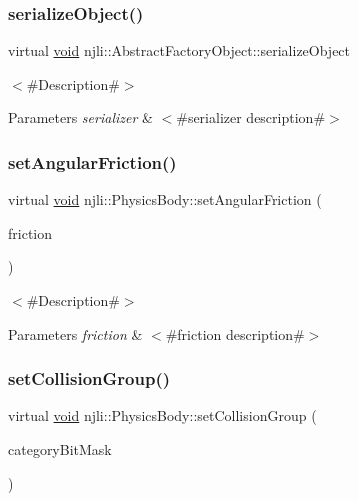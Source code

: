 \subsubsection{\texorpdfstring{serialize\+Object()}{serializeObject()}}
{\footnotesize\ttfamily virtual \mbox{\hyperlink{_thread_8h_af1e856da2e658414cb2456cb6f7ebc66}{void}} njli\+::\+Abstract\+Factory\+Object\+::serialize\+Object}

$<$\#\+Description\#$>$


\begin{DoxyParams}{Parameters}
{\em serializer} & $<$\#serializer description\#$>$ \\
\hline
\end{DoxyParams}
\mbox{\label{classnjli_1_1_physics_body_a9361f24aea1decf35d872e7509d4e9dc}} 
\subsubsection{\texorpdfstring{set\+Angular\+Friction()}{setAngularFriction()}}
{\footnotesize\ttfamily virtual \mbox{\hyperlink{_thread_8h_af1e856da2e658414cb2456cb6f7ebc66}{void}} njli\+::\+Physics\+Body\+::set\+Angular\+Friction (\begin{DoxyParamCaption}\item[{\mbox{\hyperlink{_util_8h_a5f6906312a689f27d70e9d086649d3fd}{f32}}}]{friction }\end{DoxyParamCaption})\hspace{0.3cm}{\ttfamily [virtual]}}

$<$\#\+Description\#$>$


\begin{DoxyParams}{Parameters}
{\em friction} & $<$\#friction description\#$>$ \\
\hline
\end{DoxyParams}
\mbox{\label{classnjli_1_1_physics_body_aad9390d215723749aabf132dac31d455}} 
\subsubsection{\texorpdfstring{set\+Collision\+Group()}{setCollisionGroup()}}
{\footnotesize\ttfamily virtual \mbox{\hyperlink{_thread_8h_af1e856da2e658414cb2456cb6f7ebc66}{void}} njli\+::\+Physics\+Body\+::set\+Collision\+Group (\begin{DoxyParamCaption}\item[{\mbox{\hyperlink{namespacenjli_af7b302a2b48bb644f85c88080925c974}{njli\+Bit\+Categories}}}]{category\+Bit\+Mask }\end{DoxyParamCaption})\hspace{0.3cm}{\ttfamily [virtual]}}

